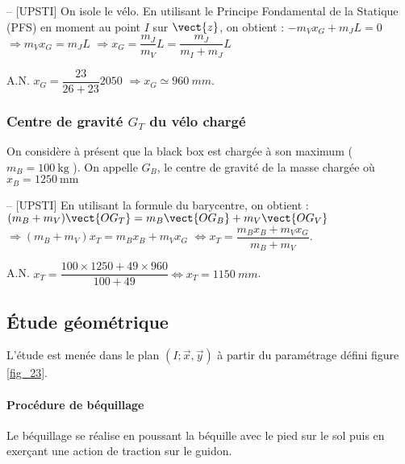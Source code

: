 \ifprof
\begin{corrige}-- [UPSTI]
On isole le vélo. En utilisant le Principe Fondamental de la Statique (PFS) en moment au point $I$ sur $\vect{z}$, on obtient :
$-m_V x_G+m_J L=0$ 
$\Rightarrow m_V x_G = m_J L$
$\Rightarrow x_G=\dfrac{m_J}{m_V}  L=\dfrac{m_J}{m_I+m_J}  L$

A.N. $x_G=\dfrac{23}{26+23}2050$ $\Rightarrow  x_G \simeq \SI{960}{mm}$.

\end{corrige}
\else
\fi

\subsubsection{Centre de gravité \(G_{T}\) du vélo chargé}
On considère à présent que la black box est chargée à son maximum ( \(m_{B}=100 \mathrm{~kg}\) ). On appelle \(G_{B}\), le centre de gravité de la masse chargée où \(x_{B}=1250 \mathrm{~mm}\)

\ifprof
\begin{corrige}-- [UPSTI]
En utilisant la formule du barycentre, on obtient :
$(m_B+m_V ) \vect{OG_T}  =m_B \vect{OG_B}+m_V \vect{OG_V}$ $\Rightarrow  (m_B+m_V ) x_T=m_B x_B+m_V x_G$ $\Leftrightarrow  x_T=\dfrac{m_B x_B+m_V x_G}{m_B+m_V}$.

A.N. $x_T=\dfrac{100\times 1250+49\times 960}{100+49} \Leftrightarrow x_T=\SI{1150}{mm}$.

\end{corrige}
\else
\fi

\subsection{Étude géométrique}
L'étude est menée dans le plan \((I ; \vec{x}, \vec{y})\) à partir du paramétrage défini figure \ref{fig_23}.

\paragraph*{Procédure de béquillage} Le béquillage se réalise en poussant la béquille avec le pied sur le sol puis en exerçant une action de traction sur le guidon.

